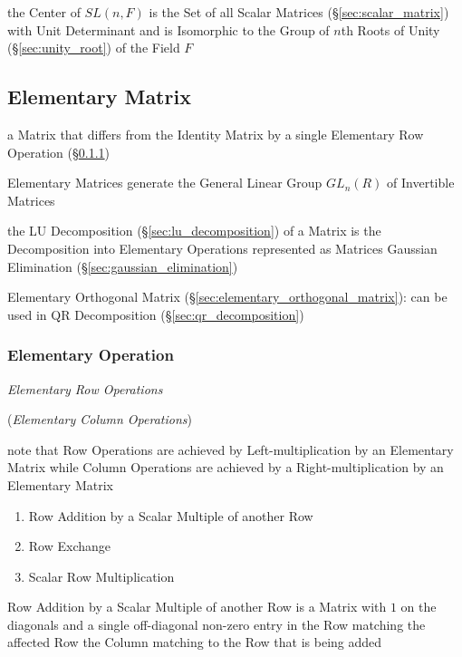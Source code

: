 the Center of $SL(n,F)$ is the Set of all Scalar Matrices
(\S\ref{sec:scalar_matrix}) with Unit Determinant and is Isomorphic to the
Group of $n$th Roots of Unity (\S\ref{sec:unity_root}) of the Field $F$



\subsection{Elementary Matrix}\label{sec:elementary_matrix}

a Matrix that differs from the Identity Matrix by a single Elementary Row
Operation (\S\ref{sec:elementary_operation})

Elementary Matrices generate the General Linear Group $GL_n(R)$ of Invertible
Matrices

the LU Decomposition (\S\ref{sec:lu_decomposition}) of a Matrix is the
Decomposition into Elementary Operations represented as Matrices \fist Gaussian
Elimination (\S\ref{sec:gaussian_elimination})

Elementary Orthogonal Matrix (\S\ref{sec:elementary_orthogonal_matrix}): can be
used in QR Decomposition (\S\ref{sec:qr_decomposition})



\subsubsection{Elementary Operation}\label{sec:elementary_operation}

\emph{Elementary Row Operations}

(\emph{Elementary Column Operations})

note that Row Operations are achieved by Left-multiplication by an Elementary
Matrix while Column Operations are achieved by a Right-multiplication by an
Elementary Matrix

\begin{enumerate}
  \item Row Addition by a Scalar Multiple of another Row
  \item Row Exchange
  \item Scalar Row Multiplication
\end{enumerate}

Row Addition by a Scalar Multiple of another Row is a Matrix with $1$ on the
diagonals and a single off-diagonal non-zero entry in the Row matching the
affected Row the Column matching to the Row that is being added

